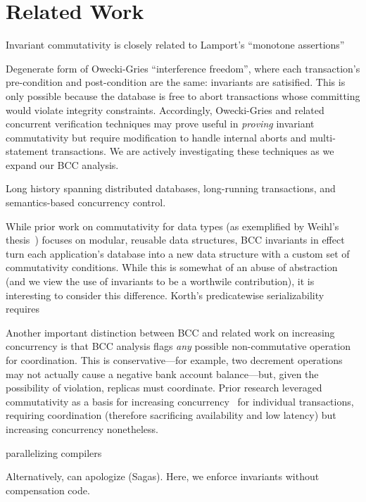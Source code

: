 
\section{Related Work}
\label{sec:relatedwork}

Invariant commutativity is closely related to Lamport's ``monotone assertions''~\cite{lamport-correctness}

Degenerate form of Owecki-Gries ``interference freedom'', where each
transaction's pre-condition and post-condition are the same:
invariants are satisified. This is only possible because the database
is free to abort transactions whose committing would violate integrity
constraints. Accordingly, Owecki-Gries and related concurrent
verification techniques may prove useful in \textit{proving} invariant
commutativity but require modification to handle internal aborts and
multi-statement transactions. We are actively investigating these
techniques as we expand our BCC analysis.

Long history spanning distributed databases, long-running
transactions, and semantics-based concurrency control.

While prior work on commutativity for data types (as exemplified by
Weihl's thesis~\cite{weihl-thesis}) focuses on modular, reusable data
structures, BCC invariants in effect turn each application's database
into a new data structure with a custom set of commutativity
conditions. While this is somewhat of an abuse of abstraction (and we
view the use of invariants to be a worthwile contribution), it is
interesting to consider this difference. Korth's predicatewise
serializability requires~\cite{korth-serializability}

Another important distinction between BCC and related work on
increasing concurrency is that BCC analysis flags \textit{any}
possible non-commutative operation for coordination. This is
conservative---for example, two decrement operations may not actually
cause a negative bank account balance---but, given the possibility of
violation, replicas must coordinate. Prior research leveraged
commutativity as a basis for increasing
concurrency~\cite{herlihy-apologizing,
  weihl-thesis,predicatewise-serializability} for individual
transactions, requiring coordination (therefore sacrificing
availability and low latency) but increasing concurrency nonetheless.

parallelizing compilers~\cite{rinard-compiler}


Alternatively, can apologize (Sagas).  Here, we enforce invariants
without compensation code.
